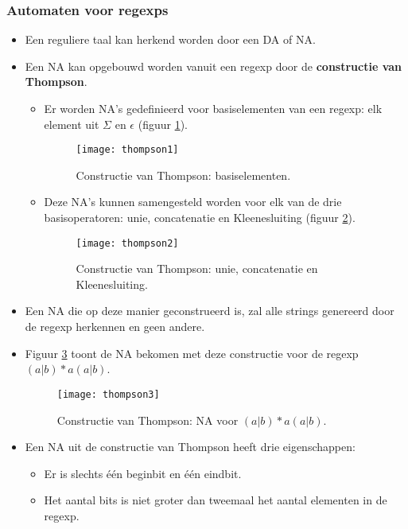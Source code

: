 \subsubsection{Automaten voor regexps}
\begin{itemize}
    \item Een reguliere taal kan herkend worden door een DA of NA.
    \item Een NA kan opgebouwd worden vanuit een regexp door de \textbf{constructie van Thompson}.
    \begin{itemize}
        \item Er worden NA's gedefinieerd voor basiselementen van een regexp: elk element uit $\Sigma$ en $\epsilon$ (figuur \ref{fig:thompson1}).
        \begin{figure}[ht]
            \centering
            \texttt{[image: thompson1]}
            \caption{Constructie van Thompson: basiselementen.}
            \label{fig:thompson1}
        \end{figure}
        \item Deze NA's kunnen samengesteld worden voor elk van de drie basisoperatoren: unie, concatenatie en Kleenesluiting (figuur \ref{fig:thompson2}).
        \begin{figure}[ht]
            \centering
            \texttt{[image: thompson2]}
            \caption{Constructie van Thompson: unie, concatenatie en Kleenesluiting.}
            \label{fig:thompson2}
        \end{figure}
    \end{itemize}
    \item Een NA die op deze manier geconstrueerd is, zal alle strings genereerd door de regexp herkennen en geen andere.
    \item Figuur \ref{fig:thompson3} toont de NA bekomen met deze constructie voor de regexp $(a|b)*a(a|b)$.
    \begin{figure}[ht]
        \centering
        \texttt{[image: thompson3]}
        \caption{Constructie van Thompson: NA voor $(a|b)*a(a|b)$.}
        \label{fig:thompson3}
    \end{figure}
    \item Een NA uit de constructie van Thompson heeft drie eigenschappen:
    \begin{itemize}
        \item Er is slechts één beginbit en één eindbit.
        \item Het aantal bits is niet groter dan tweemaal het aantal elementen in de regexp.

\end{itemize}
\end{itemize}
